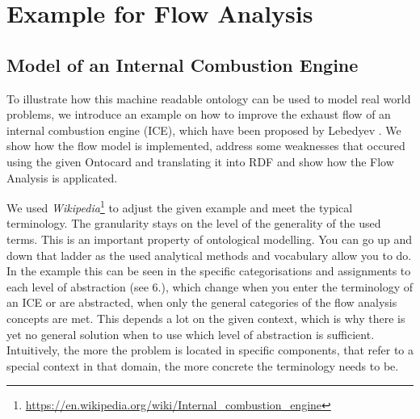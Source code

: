 \documentclass[a4paper,11pt]{article}
\begin{document}
\section{Example for Flow Analysis}
\subsection{Model of an Internal Combustion Engine}

To illustrate how this machine readable ontology can be used to model real
world problems, we introduce an example on how to improve the exhaust flow of
an internal combustion engine (ICE), which have been proposed by Lebedyev
\cite{Lebedyev2015}. We show how the flow model is implemented, address some
weaknesses that occured using the given Ontocard and translating it into RDF
and show how the Flow Analysis is applicated.

We used
\emph{Wikipedia}\footnote{\url{https://en.wikipedia.org/wiki/Internal_combustion_engine}}
to adjust the given example and meet the typical terminology. The granularity
stays on the level of the generality of the used terms.  This is an important
property of ontological modelling. You can go up and down that ladder as the
used analytical methods and vocabulary allow you to do. In the example this
can be seen in the specific categorisations and assignments to each level of
abstraction (see 6.), which change when you enter the terminology of an ICE or
are abstracted, when only the general categories of the flow analysis concepts
are met. This depends a lot on the given context, which is why there is yet no
general solution when to use which level of abstraction is sufficient.
Intuitively, the more the problem is located in specific components, that
refer to a special context in that domain, the more concrete the terminology
needs to be.
\end{document}
